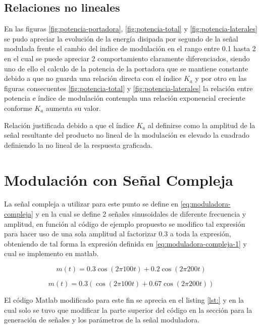 \documentclass[conference]{IEEEtran}
\begin{document}
	\subsection{\textbf{Relaciones no lineales}}
	En las figuras \ref{fig:potencia-portadora}, \ref{fig:potencia-total} y \ref{fig:potencia-laterales} se pudo apreciar la evolución de la energía disipada por segundo de la señal modulada frente el cambio del indice de modulación en el rango entre 0.1 hasta 2 en el cual se puede apreciar 2 comportamiento claramente diferenciados, siendo uno de ello el calculo de la potencia de la portadora que se mantiene constante debido a que no guarda una relación directa con el índice $K_a$ y por otro en las figuras consecuentes \ref{fig:potencia-total} y \ref{fig:potencia-laterales} la relación entre potencia e índice de modulación contempla una relación exponencial creciente conforme $K_a$ aumenta su valor.
	
	Relación justificada debido a que el índice $K_a$ al definirse como la amplitud de la señal resultante del producto no lineal de la modulación es elevado la cuadrado definiendo la no lineal de la respuesta graficada.
	
	\section{\textbf{Modulación con Señal Compleja}}
	
	La señal compleja a utilizar para este punto se define en \ref{eq:moduladora-compleja} y en la cual se define 2 señales sinusoidales de diferente frecuencia y amplitud, en función al código de ejemplo propuesto se modifico tal expresión para hacer uso de una sola amplitud al factorizar 0.3 a toda la expresión, obteniendo de tal forma la expresión definida en \ref{eq:moduladora-compleja-1} y cual se implemento en matlab.
	
		
	\begin{equation}
		m(t) = 0.3\cos(2\pi 100 t) + 0.2\cos(2\pi 200 t)
		\label{eq:moduladora-compleja}
	\end{equation}
	
	\begin{equation}
		m(t) = 0.3(\cos(2\pi 100 t) + 0.67\cos(2\pi 200 t))
		\label{eq:moduladora-compleja-1}
	\end{equation}
	
	El código Matlab modificado para este fin se aprecia en el listing \ref{lst:} y en la cual solo se tuvo que modificar la parte superior del código en la sección para la generación de señales y los parámetros de la señal moduladora.
	
\end{document}
